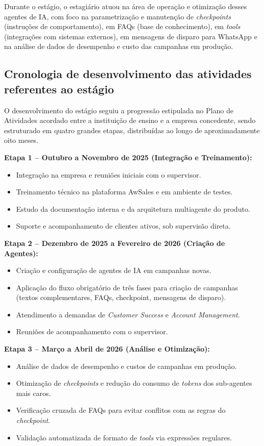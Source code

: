 \documentclass[12pt,a4paper,oneside]{article}
\begin{document}
Durante o estágio, o estagiário atuou na área de operação e otimização desses agentes de IA, com foco na parametrização e manutenção de \textit{checkpoints} (instruções de comportamento), em FAQs (base de conhecimento), em \textit{tools} (integrações com sistemas externos), em mensagens de disparo para WhatsApp e na análise de dados de desempenho e custo das campanhas em produção.

\subsection{Cronologia de desenvolvimento das atividades referentes ao estágio}

O desenvolvimento do estágio seguiu a progressão estipulada no Plano de Atividades acordado entre a instituição de ensino e a empresa concedente, sendo estruturado em quatro grandes etapas, distribuídas ao longo de aproximadamente oito meses.

\textbf{Etapa 1 -- Outubro a Novembro de 2025 (Integração e Treinamento):}
\begin{itemize}[leftmargin=2em,topsep=0pt]
  \item Integração na empresa e reuniões iniciais com o supervisor.
  \item Treinamento técnico na plataforma AwSales e em ambiente de testes.
  \item Estudo da documentação interna e da arquitetura multiagente do produto.
  \item Suporte e acompanhamento de clientes ativos, sob supervisão direta.
\end{itemize}

\textbf{Etapa 2 -- Dezembro de 2025 a Fevereiro de 2026 (Criação de Agentes):}
\begin{itemize}[leftmargin=2em,topsep=0pt]
  \item Criação e configuração de agentes de IA em campanhas novas.
  \item Aplicação do fluxo obrigatório de três fases para criação de campanhas (textos complementares, FAQs, checkpoint, mensagens de disparo).
  \item Atendimento a demandas de \textit{Customer Success} e \textit{Account Management}.
  \item Reuniões de acompanhamento com o supervisor.
\end{itemize}

\textbf{Etapa 3 -- Março a Abril de 2026 (Análise e Otimização):}
\begin{itemize}[leftmargin=2em,topsep=0pt]
  \item Análise de dados de desempenho e custos de campanhas em produção.
  \item Otimização de \textit{checkpoints} e redução do consumo de \textit{tokens} dos sub-agentes mais caros.
  \item Verificação cruzada de FAQs para evitar conflitos com as regras do \textit{checkpoint}.
  \item Validação automatizada de formato de \textit{tools} via expressões regulares.
\end{itemize}
\end{document}

